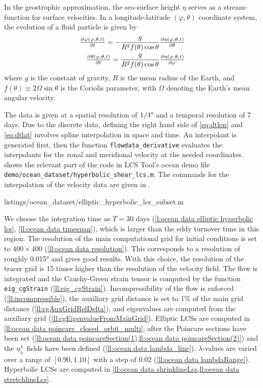 \documentclass{elsarticle}
\begin{document}
In the geostrophic approximation, the sea-surface height $\eta$ serves as a stream-function for surface velocities. In a longitude-latitude $(\varphi,\theta)$ coordinate system, the evolution of a fluid particle is given by
\begin{eqnarray}
\pd{\varphi(\varphi,\theta,t)}{t} = -\frac{g}{R^2 f(\theta) \cos\theta} \pd{\eta(\varphi,\theta,t)}{\theta}\label{eq:dtlon}\\
\pd{\theta(\varphi,\theta,t)}{t} = \frac{g}{R^2 f(\theta) \cos\theta}\pd{\eta(\varphi,\theta,t)}{\varphi}
\label{eq:dtlat}
\end{eqnarray}
where $g$ is the constant of gravity, $R$ is the mean radius of the Earth, and $f(\theta) \equiv 2\Omega\sin\theta$ is the Coriolis parameter, with $\Omega$ denoting the Earth's mean angular velocity.

The data is given at a spatial resolution of $1/4\degree$ and a temporal resolution of 7 days.
Due to the discrete data, defining the right hand side of \cref{eq:dtlon} and \cref{eq:dtlat} involves spline interpolation in space and time.
An interpolant is generated first, then the function \lstinline!flowdata_derivative! evaluates the interpolants for the zonal and meridional velocity at the needed coordinates.
 shows the relevant part of the code in LCS Tool's ocean demo file \lstinline!demo/ocean_dataset/hyperbolic_shear_lcs.m!.
The commands for the interpolation of the velocity data are given in .


        {listings/ocean_dataset/elliptic_hyperbolic_lcs_subset.m}

We choose the integration time as $T=30$ days (\cref{l:ocean data elliptic hyperbolic lcs}, \cref{ll:ocean data timespan}), which is larger than the eddy turnover time in this region. The resolution of the main computational grid for initial conditions is set to $400 \times 400$ (\cref{ll:ocean data resolution}). This corresponds to a resolution of roughly 0.015° and gives good results. With this choice, the resolution of the tracer grid is 15 times higher than the resolution of the velocity field. The flow is integrated and the Cauchy-Green strain tensor is computed by the function \lstinline!eig_cgStrain! (\cref{ll:eig_cgStrain}). Incompressibility of the flow is enforced (\cref{ll:incompressible}), the auxiliary grid distance is set to 1\% of the main grid distance (\cref{ll:cgAuxGridRelDelta}), and eigenvalues are computed from the auxiliary grid (\cref{ll:cgEigenvalueFromMainGrid}). Elliptic LCSs are computed in \cref{ll:ocean data poincare_closed_orbit_multi}, after the Poincare sections have been set (\cref{ll:ocean data poincareSection(1),ll:ocean data poincareSection(2)}) and the $\eta_\pm^\lambda$ fields have been defined (\cref{ll:ocean data lambda_line}). $\lambda$-values are varied over a range of $[0.90,1.10]$ with a step of $0.02$ (\cref{ll:ocean data lambdaRange}). Hyperbolic LCSs are computed in \cref{ll:ocean data shrinklineLcs,ll:ocean data stretchlineLcs}.
\end{document}
